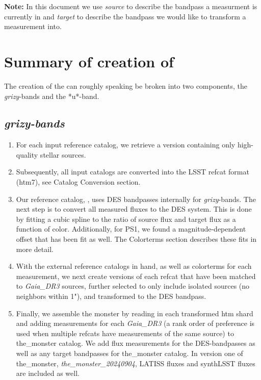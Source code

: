 \textbf{Note:} In this document we use \emph{source} to describe the bandpass a measurment is currently in and \emph{target} to describe the bandpass we would like to transform a measurement into. 

\section{Summary of creation of \monster}
The creation of the \monster can roughly speaking be broken into two components, the \textit{grizy}-bands and the *u*-band. 


\subsection{\textit{grizy-bands}}
\begin{enumerate}
    \item For each input reference catalog, we retrieve a version containing only high-quality stellar sources.
    \item Subsequently, all input catalogs are converted into the LSST refcat format (htm7), see Catalog Conversion section.
    \item Our reference catalog, \monster, uses DES bandpasses internally for \textit{grizy}-bands. The next step is to convert all measured fluxes to the DES system. This is done by fitting a cubic spline to the ratio of source flux and target flux as a function of color. Additionally, for PS1, we found a magnitude-dependent offset that has been fit as well. The Colorterms section describes these fits in more detail.
    \item With the external reference catalogs in hand, as well as colorterms for each measurement, we next create versions of each refcat that have been matched to \textit{Gaia\_DR3} sources, further selected to only include isolated sources (no neighbors within 1"), and transformed to the DES bandpass.
    \item Finally, we assemble the monster by reading in each transformed htm shard and adding measurements for each \textit{Gaia\_DR3} (a rank order of preference is used when multiple refcats have measurements of the same source) to the\_monster catalog. We add flux measurements for the DES-bandpasses as well as any target bandpasses for the\_monster catalog. In version one of the\_monster, \textit{the\_monster\_20240904}, LATISS fluxes and synthLSST fluxes are included as well.
\end{enumerate}

